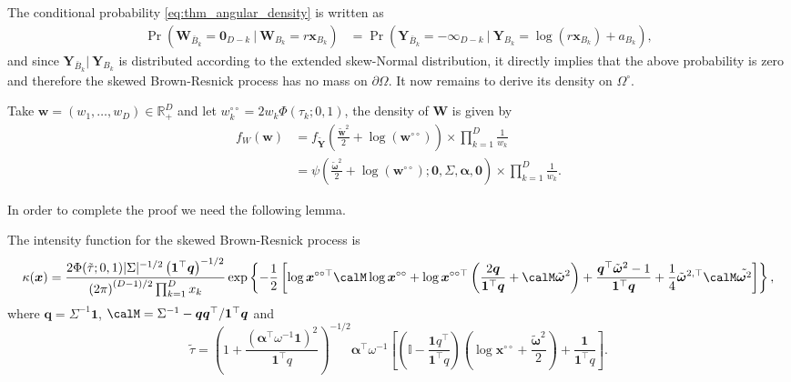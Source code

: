 \documentclass[12pt]{article}
\begin{document}
The conditional probability \eqref{eq:thm_angular_density} is written as
%
\begin{align*}
\Pr(\bm W_{\bar{B}_k} = \bm 0_{D-k} \ | \ \bm W_{B_k} = r \bm x_{B_k} )
& = \Pr(\bm Y_{\bar{B}_k} = - \bm \infty_{D-k} \ | \ \bm Y_{B_k} = \log(r \bm x_{B_k}) + a_{B_k} ),
\end{align*}
and since $\bm Y_{\bar{B}_k}| \ \bm Y_{B_k}$ is distributed according to the extended skew-Normal distribution, it directly implies that the above probability is zero and therefore the skewed Brown-Resnick process has no mass on $\partial\Omega$. It now remains to derive its density on $\Omega^\circ$.

Take $\bm w = (w_1, \ldots, w_D) \in \mathbb{R}^D_+$ and let $w_k^{\circ\circ} = 2w_k \Phi \left( \tau_k;0,1 \right)$, the density of $\bm W$ is given by
%
\begin{align}
\label{eq:fW_BR}
f_W(\bm w) &= f_{\tilde{\bm Y}} \left( \frac{\tilde{\bm w}^2}{2} + \log\left(\bm w^{\circ\circ}\right) \right) \times \prod_{k=1}^D \frac{1}{w_k} \nonumber \\
&= \psi\left( \frac{\tilde{\bm \omega}^2}{2} + \log\left(\bm w^{\circ\circ}\right); \bm 0, \Sigma, \bm \alpha, \bm 0\right) \times \prod_{k=1}^D \frac{1}{w_k}.
\end{align}
%

In order to complete the proof we need the following lemma.

\begin{lemma}
\label{lem:kappSBR}
The intensity function for the skewed Brown-Resnick process is
$$
\kappa(\bm x) =\frac{2\Phi(\tilde{\tau};0,1)| \Sigma |^{-1/2} \left( \bm 1^\top \bm q\right)^{-1/2}}{\left( 2\pi \right)^{(D-1)/2}\prod_{k=1}^Dx_k}\exp \left\{ -\frac{1}{2} \left[ \log \bm x^{\circ\circ\top} \calM \log \bm x^{\circ\circ} + \log \bm x^{\circ\circ\top} \left( \frac{2 \bm q}{\bm 1^\top \bm q}+\calM\tilde{\bm\omega}^2\right) + \frac{\bm q^\top\tilde{\bm \omega}^2 - 1}{\bm 1 ^\top \bm q } + \frac{1}{4}{\tilde{\bm\omega}}^{2,\top}\calM\tilde{\bm\omega^2} \right]\right\},
$$
where $\bm q = \Sigma^{-1} \bm 1$, $\calM = \Sigma^{-1} - \bm q \bm q^\top / \bm 1^\top \bm q$ and
%
$$\tilde{\tau}=\left(1 + \frac{\left(\bm\alpha^\top\omega^{-1}\bm 1\right)^2}{\bm 1^\top q}\right)^{-1/2}\bm\alpha^\top\omega^{-1}\left[\left(\mathbb{I} - \frac{\bm 1q^\top}{\bm 1^\top q}\right)\left(\log \bm x^{\circ\circ} + \frac{\tilde{\bm\omega}^2}{2}\right) +  \frac{\bm 1}{\bm 1^\top q} \right].$$
\end{lemma}
\end{document}
